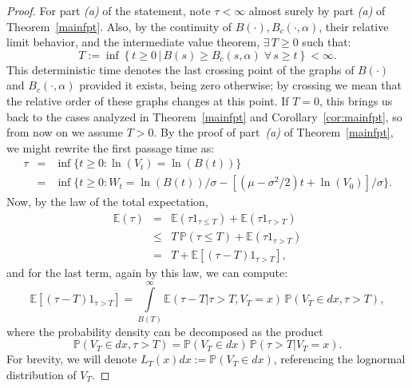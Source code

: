 \documentclass[10pt,a4paper]{amsart}
\begin{document}
\begin{proof}
For part \textit{(a)} of the statement, note $\tau<\infty$ almost surely by part \textit{(a)} of Theorem~\ref{mainfpt}. Also, by the continuity of $B(\cdot),B_c(\cdot,\alpha)$, their relative limit behavior, and the intermediate value theorem, $\exists \, T \ge 0$ such that:
$$
T:=\inf \left\lbrace t\geq 0 \, \big\vert \, B(s) \geq B_c(s,\alpha) \; \forall \, s \ge t \right\rbrace<\infty.
$$
This deterministic time denotes the last crossing point of the graphs of $B(\cdot)$ and $B_c(\cdot,\alpha)$ provided it exists, being zero otherwise; by crossing we mean that the relative order of these graphs changes at this point. If $T=0$, this brings us back to the cases analyzed in Theorem~\ref{mainfpt} and Corollary~\ref{cor:mainfpt}, so from now on we assume $T>0$. By the proof of part~\textit{(a)} of Theorem~\ref{mainfpt}, we might rewrite the first passage time as:
\begin{eqnarray}\nonumber
\tau &=& \inf \{t \ge 0 : \ln(V_t) = \ln(B(t))\}\\ \nonumber
&=& \inf \{t \ge 0 : W_t = \ln(B(t))/\sigma - \left[(\mu - \sigma^2/2)t + \ln(V_0) \right]/\sigma \}.
\end{eqnarray}
Now, by the law of the total expectation,
\begin{eqnarray}
\label{eq:total_expectation}
\nonumber
\mathbb{E}(\tau)&=&\mathbb{E}(\tau 1_{\tau\leq T})+\mathbb{E}(\tau 1_{\tau> T})\\ \nonumber
&\leq& T \, \mathbb{P}(\tau\leq T)+\mathbb{E}(\tau 1_{\tau> T}) \\
&=& T+\mathbb{E}[(\tau-T) 1_{\tau> T}],
\end{eqnarray}
and for the last term, again by this law, we can compute:
$$
\mathbb{E}[(\tau-T) 1_{\tau> T}]=\int\limits_{B(T)}^\infty\mathbb{E}(\tau-T\vert\tau>T,V_T=x) \, \mathbb{P}(V_T\in dx, \tau>T),
$$
where the probability density can be decomposed as the product
$$\mathbb{P}(V_T\in dx, \tau>T)=\mathbb{P}(V_T\in dx) \, \mathbb{P}( \tau>T\vert V_T =x).
$$
For brevity, we will denote $L_T(x) dx:=\mathbb{P}(V_T\in dx)$, referencing the lognormal distribution of $V_T$.


\end{proof}
\end{document}
